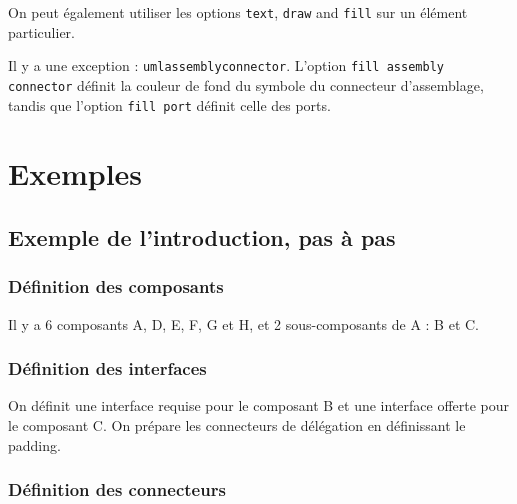\documentclass[a4paper,11pt]{report}
\newcommand{\inputTikZ}[1]{%
  }%
\newcommand{\inputTikZ}[1]{%
    \texttt{[image: fig/\#1.pdf]}%
  }%
\begin{document}
On peut également utiliser les options {\tt text}, {\tt draw} and {\tt fill} sur un élément particulier.

Il y a une exception : {\tt umlassemblyconnector}. L'option {\tt fill assembly connector} définit la couleur de fond du symbole du connecteur d'assemblage, tandis que l'option {\tt fill port} définit celle des ports.

\section{Exemples}

\subsection{Exemple de l'introduction, pas à pas}

\subsubsection{Définition des composants}

Il y a 6 composants A, D, E, F, G et H, et 2 sous-composants de A : B et C.

\medskip



\begin{center}
\inputTikZ{compdiagexstep1}
\end{center}

\subsubsection{Définition des interfaces}

On définit une interface requise pour le composant B et une interface offerte pour le composant C. On prépare les connecteurs de délégation en définissant le padding.

\medskip

\vspace{-0.4cm}
{\color{red!70!black} \vspace{-0.4cm}}


\begin{center}
\inputTikZ{compdiagexstep2}
\end{center}

\subsubsection{Définition des connecteurs}
\end{document}
